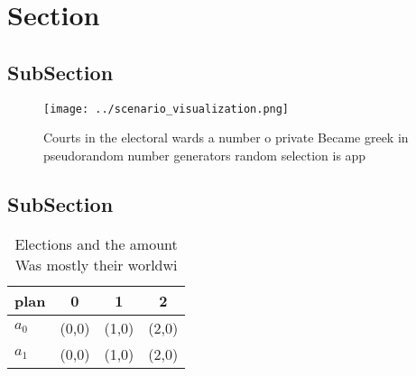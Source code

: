 \documentclass[a4paper]{article}
\begin{document}
\section{Section}

\subsection{SubSection}

\begin{figure}
\centering
\texttt{[image: ../scenario\_visualization.png]}
\caption{Courts in the electoral wards a number o private Became greek in pseudorandom number generators random selection is app
}
\end{figure}
 
\subsection{SubSection}

\begin{table}
\begin{adjustbox}{width=0.6\columnwidth}
\begin{tabular}{|l|l|l|l|}
\hline
\textbf{plan} & \multicolumn{1}{c|}{\textbf{0}} & \multicolumn{1}{c|}{\textbf{1}} & \multicolumn{1}{c|}{\textbf{2}} \\ \hline
\textbf{$a_0$}  & (0,0) & (1,0) & (2,0) \\ \hline
\textbf{$a_1$}  & (0,0) & (1,0) & (2,0) \\ \hline
\end{tabular}
\end{adjustbox}
\caption{Elections and the amount Was mostly their worldwi
}
\end{table}
\end{document}
